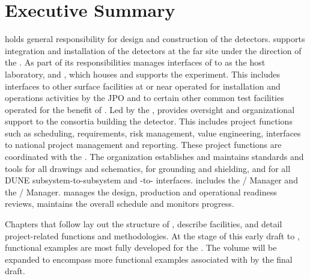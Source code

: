 \chapter{Executive Summary}
\label{vl:tc-execsum}


  holds general responsibility for design and
construction of the  detectors.  supports
integration and installation of the detectors at the far site under
the direction of the .  As part of its responsibilities
 manages interfaces of  to \fnal as the host
laboratory,  and , which houses and supports
the  experiment. This includes interfaces to other surface
facilities at or near  operated for installation and
operations activities by the JPO and to certain other common test
facilities operated for the benefit of . Led by the
 ,   provides
oversight and organizational support to the consortia building the
 detector.  This includes project functions such as
scheduling, requirements, risk management, value engineering,
interfaces to national project management and reporting. These project
functions are coordinated with the .  The 
organization establishes and maintains standards and tools for all
drawings and schematics, for grounding and shielding, and for all DUNE
subsystem-to-subsystem and -to- interfaces.
 includes the /  Manager
and the /  Manager. 
 manages the design, production and operational readiness
reviews, maintains the overall schedule and monitors progress.

Chapters that follow lay out the structure of  ,
describe  facilities, and detail project-related functions
and methodologies. At the stage of this early draft to ,
  functional examples are most fully developed
for the  . The volume will be expanded to
encompass more functional examples associated with 
 by the final draft.

